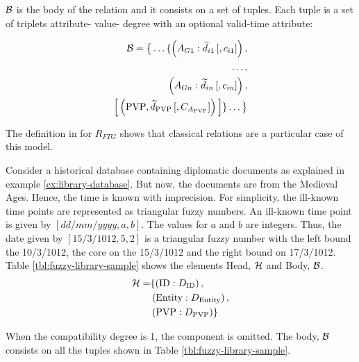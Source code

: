 \begin{definition}
$\mathcal{B}$ is the body of the relation and it consists on a set of tuples. Each tuple is a set of triplets attribute- value- degree with an optional valid-time attribute:

\begin{align}
\label{eq:body-valid-time}
\mathcal{B} = \big \lbrace \ldots \{ \left(A_{G1}:\widetilde{d}_{i1}\left[,c_{i1} \right] \right),\\
\nonumber
 \ldots,\\
 \nonumber
  \left(A_{Gn}:\widetilde{d}_{in}\left[,c_{in} \right] \right),\\
  \nonumber
   \Big[  \left( \text{PVP}, \widetilde{d}_{\text{PVP}} \left[,C_{A_{\text{PVP}}} \right] \right)  \Big] \} \ldots \big \rbrace
\end{align}

\end{definition}


The definition in \cite{Medina1994} for $R_{FTG}$ shows that classical relations are a particular case of this model. 

\begin{example}
\label{ex:sample-ft-database}
 Consider a historical database containing diplomatic documents as explained in example \ref{ex:library-database}. But now, the documents are from the Medieval Ages. Hence, the time is known with imprecision. For simplicity, the ill-known time points are represented as triangular fuzzy numbers. An ill-known time point is given by $[dd/mm/yyyy,a,b]$. The values for $a$ and $b$ are integers. Thus, the date given by $[15/3/1012,5,2]$ is a triangular fuzzy number with the left bound the 10/3/1012, the core on the 15/3/1012 and the right bound on 17/3/1012.
Table \ref{tbl:fuzzy-library-sample} shows the elements Head, $\mathcal{H}$ and Body, $\mathcal{B}$. 
\begin{align}
 \label{eq:head-ex}
\mathcal{H} = & \lbrace \left(\text{ID}:D_{\text{ID}}\right),\\
\nonumber
&  \left(\text{Entity}:D_{\text{Entity}}\right),\\
\nonumber
& \left(\text{PVP}:D_{\text{PVP}}\right) \rbrace
\end{align}

When the compatibility degree is 1, the component is omitted. The body, $\mathcal{B}$ consists on all the tuples shown in Table \ref{tbl:fuzzy-library-sample}. 

\end{example}


